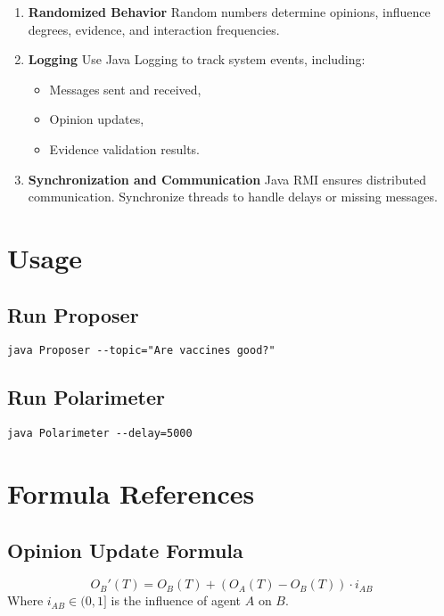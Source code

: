 \documentclass[a4paper,12pt]{article}
\begin{document}
\begin{enumerate}
    \item \textbf{Randomized Behavior}  
    Random numbers determine opinions, influence degrees, evidence, and interaction frequencies.

    \item \textbf{Logging}  
    Use Java Logging to track system events, including:  
    \begin{itemize}
        \item Messages sent and received,  
        \item Opinion updates,  
        \item Evidence validation results.  
    \end{itemize}

    \item \textbf{Synchronization and Communication}  
    Java RMI ensures distributed communication. Synchronize threads to handle delays or missing messages.
\end{enumerate}

\section*{Usage}

\subsection*{Run Proposer}
\begin{verbatim}
java Proposer --topic="Are vaccines good?"
\end{verbatim}

\subsection*{Run Polarimeter}
\begin{verbatim}
java Polarimeter --delay=5000
\end{verbatim}

\section*{Formula References}

\subsection*{Opinion Update Formula}
\[
O_B'(T) = O_B(T) + (O_A(T) - O_B(T)) \cdot i_{AB}
\]
Where \( i_{AB} \in (0, 1] \) is the influence of agent \( A \) on \( B \).
\end{document}
